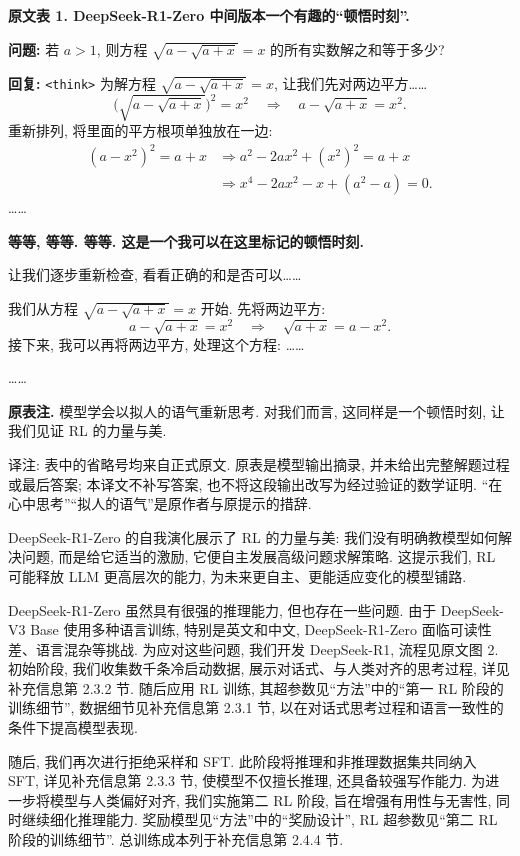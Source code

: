 \noindent\textbf{原文表 1. DeepSeek-R1-Zero 中间版本一个有趣的“顿悟时刻”.}

\noindent\textbf{问题:} 若 $a>1$, 则方程 $\sqrt{a-\sqrt{a+x}}=x$ 的所有实数解之和等于多少?

\noindent\textbf{回复:} \texttt{<think>} 为解方程 $\sqrt{a-\sqrt{a+x}}=x$, 让我们先对两边平方……
\[
\bigl(\sqrt{a-\sqrt{a+x}}\bigr)^2=x^2
\quad\Rightarrow\quad a-\sqrt{a+x}=x^2.
\]
重新排列, 将里面的平方根项单独放在一边:
\begin{align*}
(a-x^2)^2=a+x
&\Rightarrow a^2-2ax^2+(x^2)^2=a+x\\
&\Rightarrow x^4-2ax^2-x+(a^2-a)=0.
\end{align*}
……

\noindent\textbf{等等, 等等. 等等. 这是一个我可以在这里标记的顿悟时刻.}

让我们逐步重新检查, 看看正确的和是否可以……

我们从方程 $\sqrt{a-\sqrt{a+x}}=x$ 开始. 先将两边平方:
\[
a-\sqrt{a+x}=x^2\quad\Rightarrow\quad\sqrt{a+x}=a-x^2.
\]
接下来, 我可以再将两边平方, 处理这个方程: ……

……

\noindent\textbf{原表注.} 模型学会以拟人的语气重新思考. 对我们而言, 这同样是一个顿悟时刻, 让我们见证 RL 的力量与美.

\begin{remark}
译注: 表中的省略号均来自正式原文. 原表是模型输出摘录, 并未给出完整解题过程或最后答案; 本译文不补写答案, 也不将这段输出改写为经过验证的数学证明. “在心中思考”“拟人的语气”是原作者与原提示的措辞.
\end{remark}

DeepSeek-R1-Zero 的自我演化展示了 RL 的力量与美: 我们没有明确教模型如何解决问题, 而是给它适当的激励, 它便自主发展高级问题求解策略. 这提示我们, RL 可能释放 LLM 更高层次的能力, 为未来更自主、更能适应变化的模型铺路.

\label{r1n-r1}
DeepSeek-R1-Zero 虽然具有很强的推理能力, 但也存在一些问题. 由于 DeepSeek-V3 Base 使用多种语言训练, 特别是英文和中文, DeepSeek-R1-Zero 面临可读性差、语言混杂等挑战. 为应对这些问题, 我们开发 DeepSeek-R1, 流程见原文图 2. 初始阶段, 我们收集数千条冷启动数据, 展示对话式、与人类对齐的思考过程, 详见补充信息第 2.3.2 节. 随后应用 RL 训练, 其超参数见“方法”中的“第一 RL 阶段的训练细节”, 数据细节见补充信息第 2.3.1 节, 以在对话式思考过程和语言一致性的条件下提高模型表现.

随后, 我们再次进行拒绝采样和 SFT. 此阶段将推理和非推理数据集共同纳入 SFT, 详见补充信息第 2.3.3 节, 使模型不仅擅长推理, 还具备较强写作能力. 为进一步将模型与人类偏好对齐, 我们实施第二 RL 阶段, 旨在增强有用性与无害性, 同时继续细化推理能力. 奖励模型见“方法”中的“奖励设计”, RL 超参数见“第二 RL 阶段的训练细节”. 总训练成本列于补充信息第 2.4.4 节.

